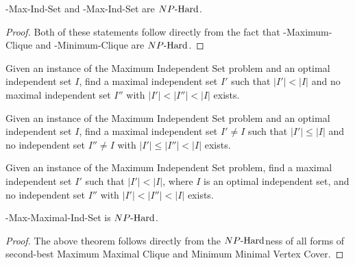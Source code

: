 \begin{theorem}
\inob{}-Max-Ind-Set and \exb{}-Max-Ind-Set are ${NP\text{-Hard{}}}$.
\end{theorem}
\begin{proof}
Both of these statements follow directly from the fact that \inob{}-Maximum-Clique and \exb{}-Minimum-Clique are ${NP\text{-Hard{}}}$.
\end{proof}

\begin{definition}
Given an instance of the Maximum Independent Set problem and an optimal independent set $I$, find a maximal independent set $I'$ such that $|I'| < |I|$ and no maximal independent set $I''$ with $|I'| < |I''| < |I|$ exists.
\end{definition}
\begin{definition}
Given an instance of the Maximum Independent Set problem and an optimal independent set $I$, find a maximal independent set $I' \neq I$ such that $|I'| \leq |I|$ and no independent set $I'' \neq I$ with $|I'| \leq |I''| < |I|$ exists.
\end{definition}

\begin{definition}
Given an instance of the Maximum Independent Set problem, find a maximal independent set $I'$ such that $|I'| < |I|$, where $I$ is an optimal independent set, and no independent set $I''$ with $|I'| < |I''| < |I|$ exists.
\end{definition}
\begin{theorem}
\exob{}-Max-Maximal-Ind-Set is ${NP\text{-Hard{}}}$.
\end{theorem}
\begin{proof}
The above theorem follows directly from the ${NP\text{-Hard{}}}$ness of all forms of second-best Maximum Maximal Clique and Minimum Minimal Vertex Cover.
\end{proof}


